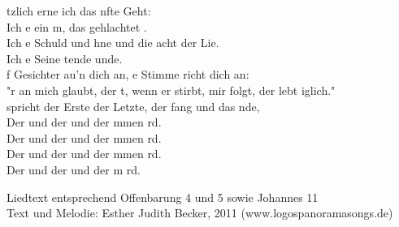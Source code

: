 tzlich erne ich das nfte Geht:\\ 
Ich e ein m, das gehlachtet .\\
Ich e Schuld und hne und die acht der Lie.\\
Ich e Seine tende unde.\\		

f Gesichter au'n dich an, e Stimme richt dich an:\\
"r an mich glaubt, der t, wenn er stirbt,  mir folgt, der lebt iglich."\\
 spricht der Erste  der Letzte, der fang und das nde,\\

Der  und der  und der mmen rd.\\ 
Der  und der  und der mmen rd.\\ 
Der  und der  und der mmen rd.\\ 
Der  und der  und der m rd.\\ 

\begin{footnotesize}
Liedtext entsprechend Offenbarung 4 und 5 sowie Johannes 11\\
Text und Melodie: Esther Judith Becker, 2011 (www.logospanoramasongs.de)
\end{footnotesize}